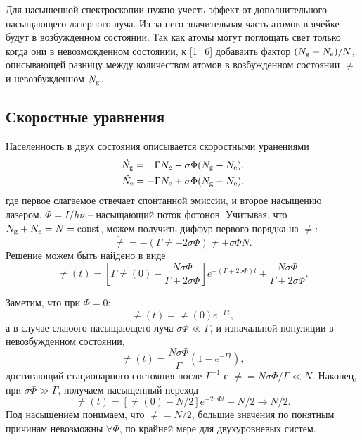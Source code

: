 Для насышенной спектроскопии нужно учесть эффект от дополнительного насыщающего лазерного луча. Из-за него значительная часть атомов в ячейке будут в возбужденном состоянии. Так как атомы могут поглощать свет только когда они в невозможденном состоянии, к \eqref{1_6} добаваить фактор $(N_{\textnormal{g}}-N_{\textnormal{e}})/N$, описывающей разницу 
между количеством атомов в возбужденном состоянии $\ne$ и невозбужденном $N_{\textnormal{g}}$. 



\subsection*{Скоростные уравнения}


 Населенность в двух состояния описывается скоростными уранениями
\begin{align*}
    \dot{N_{\textnormal{g}}} = \phantom{-}\Gamma N_e - \sigma \Phi (N_{\textnormal{g}} - N_{\textnormal{e}}), \\
    \dot{N_{\textnormal{e}}} = - \Gamma N_{\textnormal{e}} + \sigma \Phi (N_{\textnormal{g}} - N_{\textnormal{e}}),
\end{align*}
где первое слагаемое отвечает спонтанной эмиссии, и второе насыщению лазером. $\Phi = I / h \nu$ -- насыщающий поток фотонов. Учитывая, что $N_{\textnormal{g}} + N_{\textnormal{e}} = N = \textnormal{const} $, можем получить диффур первого порядка на $\ne$:
\begin{equation*}
    \dot{\ne} = - (\Gamma \ne + 2 \sigma \Phi) \ne + \sigma \Phi N.
\end{equation*}
Решение можем быть найдено в виде
\begin{equation*}
    \ne (t) = \left[
        \Gamma \ne(0) - \frac{N \sigma \Phi}{\Gamma + 2 \sigma \Phi} 
    \right] e^{-(\Gamma + 2 \sigma \Phi) t} + \frac{N \sigma \Phi}{\Gamma + 2 \sigma \Phi}.
\end{equation*}

Заметим, что при $\Phi = 0$:
\begin{equation*}
    \ne (t) = \ne (0) e^{- \Gamma t},
\end{equation*}
а в случае слаюого насыщающего луча $\sigma \Phi \ll \Gamma$, и изначальной популяции в невозбужденном состоянии,
\begin{equation*}
    \ne (t) = \frac{N \sigma \Phi}{\Gamma} \left(1 - e^{- \Gamma t}\right),
\end{equation*}
достигающий стационарного состояния после $\Gamma^{-1}$ с $\ne = N \sigma \Phi / \Gamma \ll N$.   Наконец, при $\sigma \Phi \gg \Gamma$, получаем насыщенный переход
\begin{equation*}
    \ne (t) = \left[\ne(0) - N/2\right]e^{-2 \sigma \Phi t} + N / 2 \to N/2.
\end{equation*}
Под насыщением понимаем, что $\ne = N/2$, большие значения по понятным причинам невозможны $\forall  \Phi$, по крайней мере для двухуровневых систем. 

